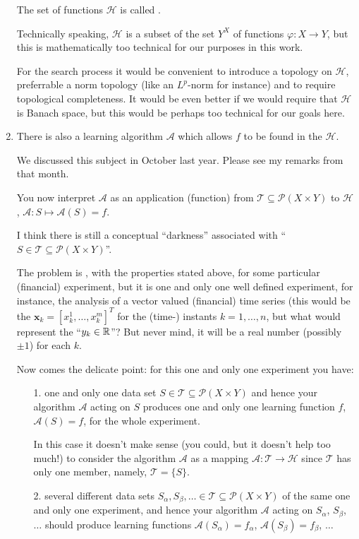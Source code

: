 \begin{description}[style=unboxed,leftmargin=0cm,itemsep=3ex]
\begin{enumerate}
The set of functions $\mathscr{H}$ is called .

Technically speaking, $\mathscr{H}$ is a subset of the set $Y^X$
of  functions $\varphi:X\to Y$, but this is mathematically too
technical for our purposes in this work.

For the search process it would be convenient to introduce a topology
on $\mathscr{H}$, preferrable a norm topology (like an $L^p$-norm for
instance) and to require topological completeness.
It would be even better if we would require that $\mathscr{H}$ is Banach
space, but this would be perhaps too technical for our goals here.


\item
There is also a learning algorithm $\mathcal{A}$ which allows $f$
to be found in the  $\mathscr{H}$.

We discussed this subject in October last year.
Please see my remarks from that month.

You now interpret $\mathcal{A}$ as an application (function) from
$\mathscr{T}\subseteq\mathscr{P}(X\times Y)$ to $\mathscr{H}$, 
$\mathcal{A}:S\mapsto\mathcal{A}(S)=f$.


I think there is still a conceptual ``darkness'' associated with 
``$S\in\mathscr{T}\subseteq\mathscr{P}(X\times Y)$''.

The problem is , with the
properties stated above, for some particular (financial) experiment,
but it is one and only one well defined experiment, for instance,
the analysis of a vector valued (financial) time series (this would
be the $\mathbf{x}_k=\left[x_k^1,\dots,x_k^m\right]^T$ for the
(time-) instants $k=1,\dots,n$, but what would represent the 
``$y_k\in{\mathbb R }$''?
But never mind, it will be a real number (possibly $\pm1$) for each $k$.

Now comes the delicate point: for this one and only one experiment
you have:
\begin{itemize}
\item[1.]
 one and only one data set 
$S\in\mathscr{T}\subseteq\mathscr{P}(X\times Y)$
and hence your algorithm $\mathcal{A}$ acting on $S$
produces one and only one learning function $f$, $\mathcal{A}(S)=f$,
for the whole experiment.

In this case it doesn't make sense (you could, but it doesn't help too
much!) to consider the algorithm $\mathcal{A}$
as a mapping $\mathcal{A}:\mathscr{T}\to\mathscr{H}$ since $\mathscr{T}$
has only one member, namely, $\mathscr{T}=\big\{S\big\}$.
\item[2.]
 several different data sets
$S_\alpha,S_\beta,\dots\in\mathscr{T}\subseteq\mathscr{P}(X\times Y)$
of the same one and only one experiment, and hence your algorithm
$\mathcal{A}$ acting on $S_\alpha$, $S_\beta$, $\dots$ should produce
learning functions $\mathcal{A}(S_\alpha)=f_\alpha$, 
$\mathcal{A}(S_\beta)=f_\beta$, $\dots$


\end{itemize}
\end{enumerate}
\end{description}
